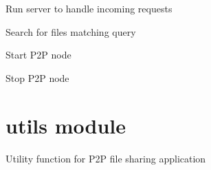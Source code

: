 \documentclass[letterpaper,10pt,english]{sphinxmanual}
\begin{document}
\begin{fulllineitems}
\begin{fulllineitems}
\label{\detokenize{node:node.P2PNode.run_server}}
\pysigstartsignatures
\pysiglinewithargsret
{}
{}
{}
\pysigstopsignatures
\sphinxAtStartPar
Run server to handle incoming requests

\end{fulllineitems}


\begin{fulllineitems}
\label{\detokenize{node:node.P2PNode.search_files}}
\pysigstartsignatures
\pysiglinewithargsret
{}
{}
{}
\pysigstopsignatures
\sphinxAtStartPar
Search for files matching query

\end{fulllineitems}


\begin{fulllineitems}
\label{\detokenize{node:node.P2PNode.start}}
\pysigstartsignatures
\pysiglinewithargsret
{}
{}
{}
\pysigstopsignatures
\sphinxAtStartPar
Start P2P node

\end{fulllineitems}


\begin{fulllineitems}
\label{\detokenize{node:node.P2PNode.stop}}
\pysigstartsignatures
\pysiglinewithargsret
{}
{}
{}
\pysigstopsignatures
\sphinxAtStartPar
Stop P2P node

\end{fulllineitems}


\end{fulllineitems}


\sphinxstepscope


\section{utils module}
\label{\detokenize{utils:module-utils}}\label{\detokenize{utils:utils-module}}\label{\detokenize{utils::doc}}
\sphinxAtStartPar
Utility function for P2P file sharing application
\end{document}
